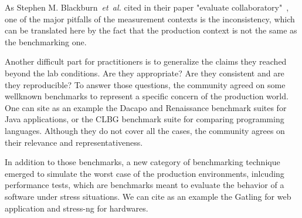 As Stephen M. Blackburn~\emph{et~al.} cited in their paper "evaluate collaboratory"~\cite{stephen_evaluate_2012}, one of the major pitfalls of the measurement contexts is the inconsistency, which can be translated here by the fact that the production context is not the same as the benchmarking one.

Another difficult part for practitioners is to generalize the claims they reached beyond the lab conditions.
Are they appropriate?
Are they consistent and are they reproducible?
To answer those questions, the community agreed on some wellknown benchmarks to represent a specific concern of the production world.
One can site as an example the Dacapo and Renaissance benchmark suites for Java applications, or the CLBG benchmark suite for comparing programming languages.
Although they do not cover all the cases, the community agrees on their relevance and representativeness.

In addition to those benchmarks, a new category of benchmarking technique emerged to simulate the worst case of the production environments, inlcuding performance tests, which are benchmarks meant to evaluate the behavior of a software under stress situations.
We can cite as an example the Gatling for web application and stress-ng for hardwares.%
